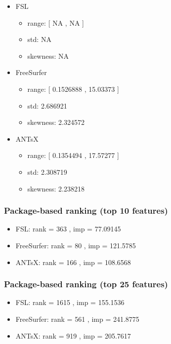 \documentclass[
  10pt,
]{article}
\begin{document}
\begin{itemize}
\item
  FSL

  \begin{itemize}
  \item
    range: {[} NA , NA {]}
  \item
    std: NA
  \item
    skewness: NA
  \end{itemize}
\item
  FreeSurfer

  \begin{itemize}
  \item
    range: {[} 0.1526888 , 15.03373 {]}
  \item
    std: 2.686921
  \item
    skewness: 2.324572
  \end{itemize}
\item
  ANTsX

  \begin{itemize}
  \item
    range: {[} 0.1354494 , 17.57277 {]}
  \item
    std: 2.308719
  \item
    skewness: 2.238218
  \end{itemize}
\end{itemize}

\hypertarget{package-based-ranking-top-10-features}{%
\subsubsection{Package-based ranking (top 10
features)}\label{package-based-ranking-top-10-features}}

\begin{itemize}
\item
  FSL: rank = 363 , imp = 77.09145
\item
  FreeSurfer: rank = 80 , imp = 121.5785
\item
  ANTsX: rank = 166 , imp = 108.6568
\end{itemize}

\hypertarget{package-based-ranking-top-25-features}{%
\subsubsection{Package-based ranking (top 25
features)}\label{package-based-ranking-top-25-features}}

\begin{itemize}
\item
  FSL: rank = 1615 , imp = 155.1536
\item
  FreeSurfer: rank = 561 , imp = 241.8775
\item
  ANTsX: rank = 919 , imp = 205.7617
\end{itemize}
\end{document}
